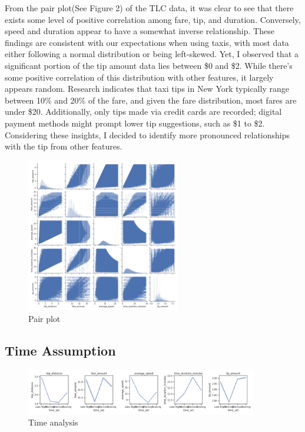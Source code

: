 \documentclass[11pt]{article}
\begin{document}
From the pair plot(See Figure 2) of the TLC data, it was clear to see that there exists some level of positive correlation among fare, tip, and duration. Conversely, speed and duration appear to have a somewhat inverse relationship. These findings are consistent with our expectations when using taxis, with most data either following a normal distribution or being left-skewed. Yet, I observed that a significant portion of the tip amount data lies between \$0 and \$2. While there's some positive correlation of this distribution with other features, it largely appears random. Research indicates that taxi tips in New York typically range between 10\% and 20\% of the fare, and given the fare distribution, most fares are under \$20. Additionally, only tips made via credit cards are recorded; digital payment methods might prompt lower tip suggestions, such as \$1 to \$2. Considering these insights, I decided to identify more pronounced relationships with the tip from other features.
\begin{figure}[h]
    \includegraphics[width=0.6\textwidth]{plots/pair plot.png}
    \centering
    \caption{Pair plot}
\end{figure}


\subsection{Time Assumption}

\begin{figure}[h]
    \includegraphics[width=0.9\textwidth]{plots/combined plot.png}
    \centering
    \caption{Time analysis}
\end{figure}
\end{document}
